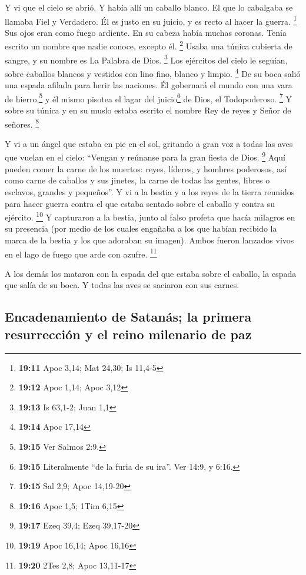  Y vi que el cielo se abrió. Y había allí un caballo
blanco. El que lo cabalgaba se llamaba Fiel y Verdadero. Él es justo en
su juicio, y es recto al hacer la guerra. \footnote{\textbf{19:11} Apoc
  3,14; Mat 24,30; Is 11,4-5}  Sus ojos eran como fuego
ardiente. En su cabeza había muchas coronas. Tenía escrito un nombre que
nadie conoce, excepto él. \footnote{\textbf{19:12} Apoc 1,14; Apoc 3,12}
 Usaba una túnica cubierta de sangre, y su nombre es La
Palabra de Dios. \footnote{\textbf{19:13} Is 63,1-2; Juan 1,1}
 Los ejércitos del cielo le seguían, sobre caballos
blancos y vestidos con lino fino, blanco y limpio. \footnote{\textbf{19:14}
  Apoc 17,14}  De su boca salió una espada afilada para
herir las naciones. Él gobernará el mundo con una vara de
hierro,\footnote{\textbf{19:15} Ver Salmos 2:9.} y él mismo pisotea el
lagar del juicio\footnote{\textbf{19:15} Literalmente ``de la furia de
  su ira''. Ver 14:9, y 6:16.} de Dios, el Todopoderoso. \footnote{\textbf{19:15}
  Sal 2,9; Apoc 14,19-20}  Y sobre su túnica y en su
muslo estaba escrito el nombre Rey de reyes y Señor de señores.
\footnote{\textbf{19:16} Apoc 1,5; 1Tim 6,15}

 Y vi a un ángel que estaba en pie en el sol, gritando a
gran voz a todas las aves que vuelan en el cielo: ``Vengan y reúnanse
para la gran fiesta de Dios. \footnote{\textbf{19:17} Ezeq 39,4; Ezeq
  39,17-20}  Aquí pueden comer la carne de los muertos:
reyes, líderes, y hombres poderosos, así como carne de caballos y sus
jinetes, la carne de todas las gentes, libres o esclavos, grandes y
pequeños''.  Y vi a la bestia y a los reyes de la tierra
reunidos para hacer guerra contra el que estaba sentado sobre el caballo
y contra su ejército. \footnote{\textbf{19:19} Apoc 16,14; Apoc 16,16}
 Y capturaron a la bestia, junto al falso profeta que
hacía milagros en su presencia (por medio de los cuales engañaba a los
que habían recibido la marca de la bestia y los que adoraban su imagen).
Ambos fueron lanzados vivos en el lago de fuego que arde con azufre.
\footnote{\textbf{19:20} 2Tes 2,8; Apoc 13,11-17}

 A los demás los mataron con la espada del que estaba
sobre el caballo, la espada que salía de su boca. Y todas las aves se
saciaron con sus carnes.

\hypertarget{encadenamiento-de-satanuxe1s-la-primera-resurrecciuxf3n-y-el-reino-milenario-de-paz}{%
\subsection{Encadenamiento de Satanás; la primera resurrección y el
reino milenario de
paz}\label{encadenamiento-de-satanuxe1s-la-primera-resurrecciuxf3n-y-el-reino-milenario-de-paz}}

